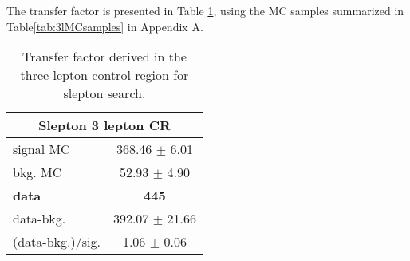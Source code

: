 The transfer factor is presented in Table \ref{tab:WZslepton}, using the MC samples summarized in Table\ref{tab:3lMCsamples} in Appendix A.
\begin{table}[ht!]
\def\arraystretch{1.2}
\setlength{\belowcaptionskip}{6pt}
\small
\centering
\caption{Transfer factor derived in the three lepton control region for slepton search.}
\label{tab:WZslepton}
\begin{tabular}{l c }
\hline \hline
\multicolumn{2}{c}{Slepton 3 lepton CR}  \\\hline
signal MC        & 368.46     $\pm$  6.01    \\
bkg. MC          & 52.93  $\pm$  4.90\\ \hline
\textbf{data}       & \textbf{445}  \\
data-bkg.        &  392.07   $\pm$  21.66 \\ \hline
(data-bkg.)/sig. & 1.06   $\pm$  0.06\\                  \hline\hline
\end{tabular}
\end{table}
